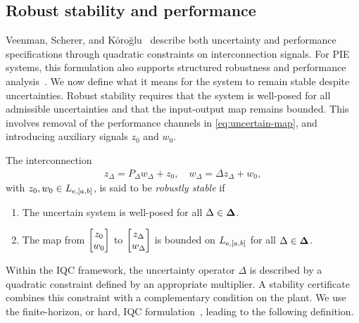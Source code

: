 \subsection{Robust stability and performance}
Veenman, Scherer, and K\"oro\u{g}lu~\cite{veenman2016robust} describe both
uncertainty and performance specifications through quadratic constraints on
interconnection signals.
For PIE systems, this formulation also supports structured robustness and
performance analysis~\cite{10156335,lenssen2025muanalysissynthesisframeworkpartial}.
We now define what it means for the system to remain stable despite
uncertainties.
Robust stability requires that the system is well-posed for all admissible
uncertainties and that the input-output map remains bounded. 
This involves removal of the performance channels in
\eqref{eq:uncertain-map}, and
introducing auxiliary signals $z_0$ and $w_0$.
\begin{definition}
The interconnection
\begin{align}\label{eqn:rob-stab-interconnect}
z_\Delta = P_\Delta w_\Delta + z_0, \quad
w_\Delta = \Delta z_\Delta + w_0,
\end{align}
with $z_0, w_0 \in L_{{\mathrm{e}},[a,b]}$, is said to be
\emph{robustly stable} if
\begin{enumerate}
\item The uncertain system is well-posed for all $\Delta\in\mathbf{\Delta}$.
\item The map from $\begin{bmatrix}z_0\\w_0\end{bmatrix}$ to
$\begin{bmatrix}z_\Delta\\w_\Delta\end{bmatrix}$ is bounded on $L_{{\mathrm{e}},[a,b]}$
for all $\Delta\in\mathbf{\Delta}$.
\end{enumerate}
\end{definition}
Within the IQC framework, the uncertainty operator $\Delta$ is described by a
quadratic constraint defined by an appropriate multiplier. A stability
certificate combines this constraint with a complementary condition on the
plant. We use the finite-horizon, or hard, IQC
formulation~\cite{6915700,10156335}, leading to the following definition.

